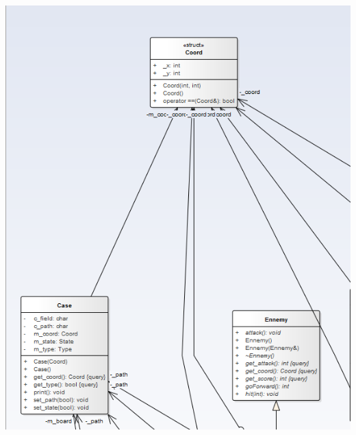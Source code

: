 \documentclass[12pt,a4paper]{article}
\begin{document}
  \includegraphics[height=20cm,width=15cm]{classDiagram2.png}

  
\end{document}
